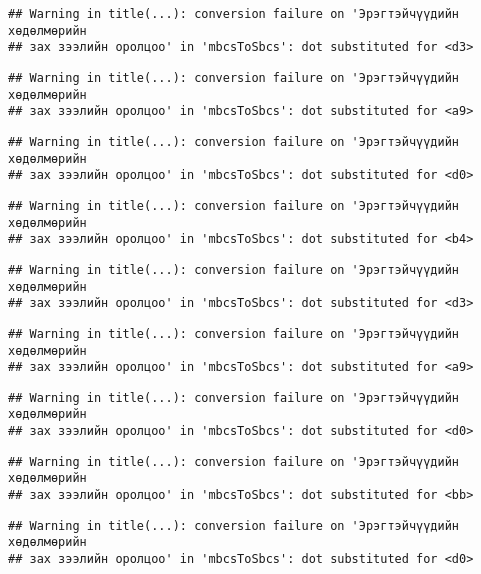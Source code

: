 \documentclass[]{article}
\begin{document}
\begin{verbatim}
## Warning in title(...): conversion failure on 'Эрэгтэйчүүдийн хөдөлмөрийн
## зах зээлийн оролцоо' in 'mbcsToSbcs': dot substituted for <d3>
\end{verbatim}

\begin{verbatim}
## Warning in title(...): conversion failure on 'Эрэгтэйчүүдийн хөдөлмөрийн
## зах зээлийн оролцоо' in 'mbcsToSbcs': dot substituted for <a9>
\end{verbatim}

\begin{verbatim}
## Warning in title(...): conversion failure on 'Эрэгтэйчүүдийн хөдөлмөрийн
## зах зээлийн оролцоо' in 'mbcsToSbcs': dot substituted for <d0>
\end{verbatim}

\begin{verbatim}
## Warning in title(...): conversion failure on 'Эрэгтэйчүүдийн хөдөлмөрийн
## зах зээлийн оролцоо' in 'mbcsToSbcs': dot substituted for <b4>
\end{verbatim}

\begin{verbatim}
## Warning in title(...): conversion failure on 'Эрэгтэйчүүдийн хөдөлмөрийн
## зах зээлийн оролцоо' in 'mbcsToSbcs': dot substituted for <d3>
\end{verbatim}

\begin{verbatim}
## Warning in title(...): conversion failure on 'Эрэгтэйчүүдийн хөдөлмөрийн
## зах зээлийн оролцоо' in 'mbcsToSbcs': dot substituted for <a9>
\end{verbatim}

\begin{verbatim}
## Warning in title(...): conversion failure on 'Эрэгтэйчүүдийн хөдөлмөрийн
## зах зээлийн оролцоо' in 'mbcsToSbcs': dot substituted for <d0>
\end{verbatim}

\begin{verbatim}
## Warning in title(...): conversion failure on 'Эрэгтэйчүүдийн хөдөлмөрийн
## зах зээлийн оролцоо' in 'mbcsToSbcs': dot substituted for <bb>
\end{verbatim}

\begin{verbatim}
## Warning in title(...): conversion failure on 'Эрэгтэйчүүдийн хөдөлмөрийн
## зах зээлийн оролцоо' in 'mbcsToSbcs': dot substituted for <d0>
\end{verbatim}
\end{document}
